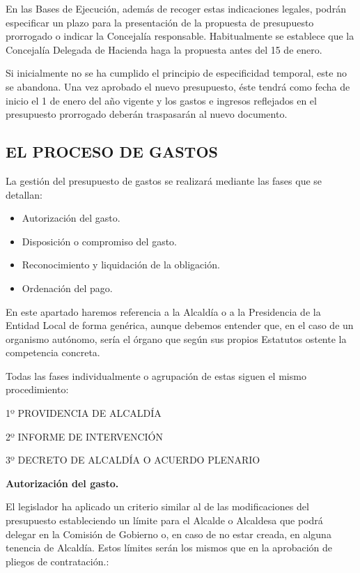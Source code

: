 \documentclass[
]{article}
\providecommand{\tightlist}{%
  \setlength{\itemsep}{0pt}\setlength{\parskip}{0pt}}
\begin{document}
En las Bases de Ejecución, además de recoger estas indicaciones legales,
podrán especificar un plazo para la presentación de la propuesta de
presupuesto prorrogado o indicar la Concejalía responsable.
Habitualmente se establece que la Concejalía Delegada de Hacienda haga
la propuesta antes del 15 de enero.

Si inicialmente no se ha cumplido el principio de especificidad
temporal, este no se abandona. Una vez aprobado el nuevo presupuesto,
éste tendrá como fecha de inicio el 1 de enero del año vigente y los
gastos e ingresos reflejados en el presupuesto prorrogado deberán
traspasarán al nuevo documento.

\hypertarget{el-proceso-de-gastos}{%
\subsection{EL PROCESO DE GASTOS}\label{el-proceso-de-gastos}}

La gestión del presupuesto de gastos se realizará mediante las fases que
se detallan:

\begin{itemize}
\tightlist
\item
  Autorización del gasto.
\item
  Disposición o compromiso del gasto.
\item
  Reconocimiento y liquidación de la obligación.
\item
  Ordenación del pago.
\end{itemize}

En este apartado haremos referencia a la Alcaldía o a la Presidencia de
la Entidad Local de forma genérica, aunque debemos entender que, en el
caso de un organismo autónomo, sería el órgano que según sus propios
Estatutos ostente la competencia concreta.

Todas las fases individualmente o agrupación de estas siguen el mismo
procedimiento:

1º PROVIDENCIA DE ALCALDÍA

2º INFORME DE INTERVENCIÓN

3º DECRETO DE ALCALDÍA O ACUERDO PLENARIO

\textbf{Autorización del gasto.}

El legislador ha aplicado un criterio similar al de las modificaciones
del presupuesto estableciendo un límite para el Alcalde o Alcaldesa que
podrá delegar en la Comisión de Gobierno o, en caso de no estar creada,
en alguna tenencia de Alcaldía. Estos límites serán los mismos que en la
aprobación de pliegos de contratación.:
\end{document}
